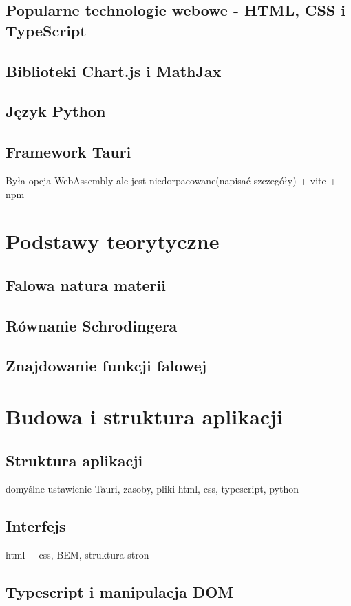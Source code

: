 \documentclass{SGGW-thesis}
\begin{document}
	\section{Popularne technologie webowe - HTML, CSS i TypeScript}
	\section{Biblioteki Chart.js i MathJax}
	\section{Język Python}
	\section{Framework Tauri}
	Była opcja WebAssembly ale jest niedorpacowane(napisać szczegóły)
	+ vite + npm
	
\chapter{Podstawy teorytyczne}
	\section{Falowa natura materii}
	\section{Równanie Schrodingera}
	\section{Znajdowanie funkcji falowej}
	
\chapter{Budowa i struktura aplikacji}
	\section{Struktura aplikacji}
	domyślne ustawienie Tauri, zasoby, pliki html, css, typescript, python
	\section{Interfejs}
	html + css, BEM, struktura stron
	\section{Typescript i manipulacja DOM}
\end{document}
